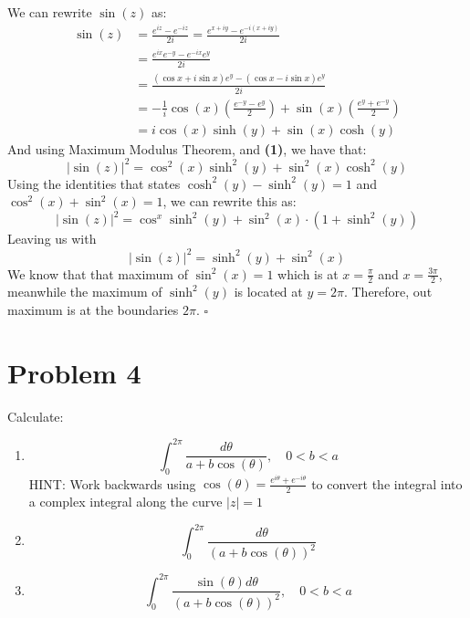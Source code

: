 \documentclass[12pt]{article}
\newenvironment{proof}{\noindent{\bf Proof.}}{\hfill $\square$\medskip}
\begin{document}
\begin{proof}
    We can rewrite $\sin(z)$ as:
    \begin{equation}
        \begin{split}
            \sin(z)&=\frac{e^{iz}-e^{-iz}}{2i}=\frac{e^{x+iy}-e^{-i(x+iy)}}{2i}\\
            &=\frac{e^{ix}e^{-y}-e^{-ix}e^{y}}{2i}\\
            &=\frac{(\cos x+i\sin x)e^{y}-(\cos x-i\sin x)e^{y}}{2i}\\
            &=-\frac{1}{i}\cos (x)\left(\frac{e^{-y}-e^{y}}{2}\right)+\sin (x)\left(\frac{e^{y}+e^{-y}}{2}\right)\\
            &=i\cos(x)\sinh(y)+\sin(x)\cosh(y)
        \end{split}
    \end{equation}
    And using Maximum Modulus Theorem, and \textbf{(1)}, we have that:
    $$\left|\sin(z)\right|^{2}=\cos^{2}(x)\sinh^{2}(y)+\sin^{2}(x)\cosh^{2}(y)$$
    Using the identities that states $\cosh^{2}(y)-\sinh^{2}(y)=1$ and
    $\cos^{2}(x)+\sin^{2}(x)=1$, we can rewrite this as:
    $$\left|\sin(z)\right|^{2}=\cos^{x}\sinh^{2}(y)+\sin^{2}(x)\cdot(1+\sinh^{2}(y))$$
    Leaving us with
    $$\left|\sin(z)\right|^{2}=\sinh^{2}(y)+\sin^{2}(x)$$ We know that that
    maximum of $\sin^{2}(x)=1$ which is at $x=\frac{\pi}{2}$ and
    $x=\frac{3\pi}{2}$, meanwhile the maximum of $\sinh^{2}(y)$ is located at
    $y=2\pi$. Therefore, out maximum is at the boundaries $2\pi$.
\end{proof}


\section{Problem 4}
Calculate:
\begin{enumerate}[label=\textbf{(\alph*)}]
    \item $$\int_{0}^{2\pi}\frac{d\theta}{a+b\cos(\theta)},\quad 0<b<a$$
          HINT: Work backwards using $\cos(\theta)=\frac{e^{i\theta}+e^{-i\theta}}{2}$ to convert the integral into a complex integral along the curve $\left |z\right |=1$
    \item $$\int_{0}^{2\pi}\frac{d\theta}{(a+b\cos(\theta))^{2}}$$
    \item $$\int_{0}^{2\pi}\frac{\sin(\theta)d\theta}{(a+b\cos(\theta))^{2}},\quad 0<b<a$$
\end{enumerate}
\end{document}
